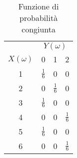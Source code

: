 \begin{center}
	\begin{table}[H]
		\begin{center}
			\begin{tabular}{|c|ccc|}
				\hline
				            & \multicolumn{3}{c|}{$Y(\omega)$}                                   \\
				$X(\omega)$ & 0                                & 1             & 2               \\
				\hline 1    & $\frac{1}{6}$                    & 0             & 0               \\
				2           & 0                                & $\frac{1}{6}$ & 0               \\
				3           & $\frac{1}{6}$                    & 0             & 0               \\
				4           & 0                                & 0             & $\frac{1}{6}$   \\
				5           & $\frac{1}{6}$                    & 0             & 0               \\
				6           & 0                                & 0             & $ \frac{1}{6} $ \\
				\hline
			\end{tabular}
		\end{center}
		\caption{Funzione di probabilità congiunta}
	\end{table}
\end{center}

